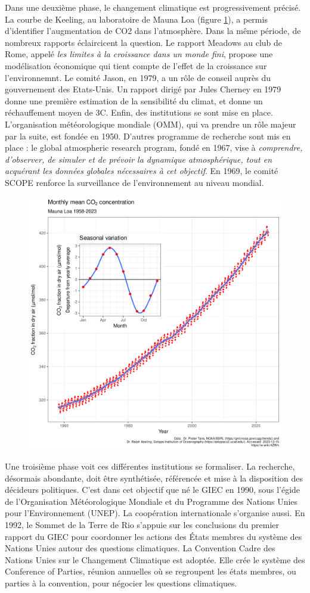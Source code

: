 Dans une deuxième phase, le changement climatique est progressivement précisé. La courbe de Keeling, au laboratoire de Mauna Loa (figure \ref{fig:keeling}), a permis d'identifier l'augmentation de CO2 dans l'atmosphère. Dans la même période, de nombreux rapports éclaircicent la question. Le rapport Meadows au club de Rome, appelé \emph{les limites à la croissance dans un monde fini}, propose une modélisation économique qui tient compte de l'effet de la croissance sur l'environnemnt. Le comité Jason, en 1979, a un rôle de conseil auprès du gouvernement des Etats-Unis. Un rapport dirigé par Jules Cherney en 1979 donne une première estimation de la sensibilité du climat, et donne un réchauffement moyen de 3\textdegree C. Enfin, des institutions se sont mise en place. L'organisation météorologique mondiale (OMM), qui va prendre un rôle majeur par la suite, est fondée en 1950. D'autres programme de recherche sont mis en place : le global atmospheric research program, fondé en 1967, vise à \emph{comprendre, d’observer, de simuler et de prévoir la dynamique atmosphérique, tout en acquérant les données globales nécessaires à cet objectif}. En 1969, le comité SCOPE renforce la surveillance de l'environnement au niveau mondial. 

\begin{figure}
    \centering
    \includegraphics[width=0.5\linewidth]{figures/keeling_curve.png}
    \label{fig:keeling}
\end{figure}

Une troisième phase voit ces différentes institutions se formaliser. La recherche, désormais abondante, doit être synthétisée, référencée et mise à la disposition des décideurs politiques. C'est dans cet objectif que né le GIEC en 1990, sous l'égide de l'Organisation Météorologique Mondiale et du Programme des Nations Unies pour l'Environnement (UNEP). La coopération internationale s'organise aussi. En 1992, le Sommet de la Terre de Rio s'appuie sur les conclusions du premier rapport du GIEC pour coordonner les actions des États membres du système des Nations Unies autour des questions climatiques. La Convention Cadre des Nations Unies sur le Changement Climatique est adoptée. Elle crée le système des Conference of Parties, réunion annuelles où se regroupent les états membres, ou parties à la convention, pour négocier les questions climatiques.



